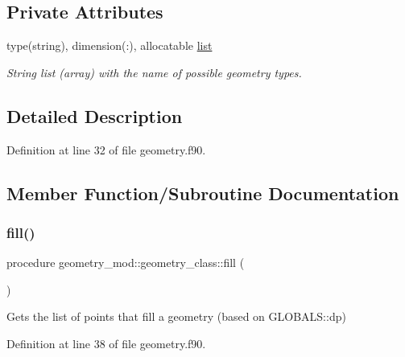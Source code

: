 \subsection*{Private Attributes}
\begin{DoxyCompactItemize}
\item 
type(string), dimension(\+:), allocatable \mbox{\hyperlink{structgeometry__mod_1_1geometry__class_a218ff308d9bb94f4386573d7329babc6}{list}}
\begin{DoxyCompactList}\small\item\em String list (array) with the name of possible geometry types. \end{DoxyCompactList}\end{DoxyCompactItemize}


\subsection{Detailed Description}


Definition at line 32 of file geometry.\+f90.



\subsection{Member Function/\+Subroutine Documentation}
\mbox{\label{structgeometry__mod_1_1geometry__class_a0afee5607f0e2443a862741e40794368}} 
\subsubsection{\texorpdfstring{fill()}{fill()}}
{\footnotesize\ttfamily procedure geometry\+\_\+mod\+::geometry\+\_\+class\+::fill (\begin{DoxyParamCaption}{ }\end{DoxyParamCaption})\hspace{0.3cm}{\ttfamily [private]}}



Gets the list of points that fill a geometry (based on G\+L\+O\+B\+A\+L\+S\+::dp) 



Definition at line 38 of file geometry.\+f90.

\mbox{\label{structgeometry__mod_1_1geometry__class_a75f5a37d0b38c8baf66ee5089ea44d7a}} 

